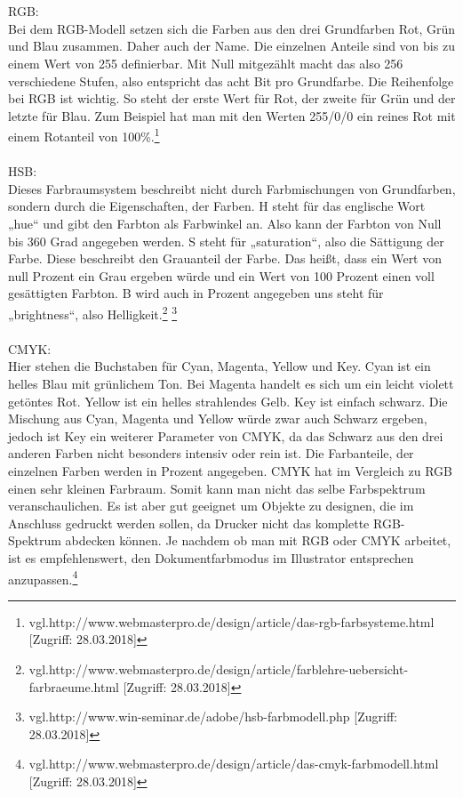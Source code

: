 \leavevmode \\
\leavevmode \\
RGB:
\leavevmode \\
Bei dem RGB-Modell setzen sich die Farben aus den drei Grundfarben Rot, Grün und Blau zusammen. Daher auch der Name. Die einzelnen Anteile sind von bis zu einem Wert von 255 definierbar. Mit Null mitgezählt macht das also 256 verschiedene Stufen, also entspricht das acht Bit pro Grundfarbe. Die Reihenfolge bei RGB ist wichtig. So steht der erste Wert für Rot, der zweite für Grün und der letzte für Blau. Zum Beispiel hat man mit den Werten 255/0/0 ein reines Rot mit einem Rotanteil von 100\%.\footnote{\label{} vgl.http://www.webmasterpro.de/design/article/das-rgb-farbsysteme.html [Zugriff: 28.03.2018]}
\leavevmode \\
\leavevmode \\
HSB:
\leavevmode \\
Dieses Farbraumsystem beschreibt nicht durch Farbmischungen von Grundfarben, sondern durch die Eigenschaften, der Farben. H steht für das englische Wort „hue“ und gibt den Farbton als Farbwinkel an. Also kann der Farbton von Null bis 360 Grad angegeben werden. S steht für „saturation“, also die Sättigung der Farbe. Diese beschreibt den Grauanteil der Farbe. Das heißt, dass ein Wert von null Prozent ein Grau ergeben würde und ein Wert von 100 Prozent einen voll gesättigten Farbton. B wird auch in Prozent angegeben uns steht für „brightness“, also Helligkeit.\footnote{\label{} vgl.http://www.webmasterpro.de/design/article/farblehre-uebersicht-farbraeume.html [Zugriff: 28.03.2018]}
\footnote{\label{} vgl.http://www.win-seminar.de/adobe/hsb-farbmodell.php [Zugriff: 28.03.2018]}
\leavevmode \\
\leavevmode \\
CMYK:
\leavevmode \\
Hier stehen die Buchstaben für Cyan, Magenta, Yellow und Key. Cyan ist ein helles Blau mit grünlichem Ton. Bei Magenta handelt es sich um ein leicht violett getöntes Rot. Yellow ist ein helles strahlendes Gelb. Key ist einfach schwarz. Die Mischung aus Cyan, Magenta und Yellow würde zwar auch Schwarz ergeben, jedoch ist Key ein weiterer Parameter von CMYK, da das Schwarz aus den drei anderen Farben nicht besonders intensiv oder rein ist. Die Farbanteile, der einzelnen Farben werden in Prozent angegeben. CMYK hat im Vergleich zu RGB einen sehr kleinen Farbraum. Somit kann man nicht das selbe Farbspektrum veranschaulichen. Es ist aber gut geeignet um Objekte zu designen, die im Anschluss gedruckt werden sollen, da Drucker nicht das komplette RGB-Spektrum abdecken können. Je nachdem ob man mit RGB oder CMYK arbeitet, ist es empfehlenswert, den Dokumentfarbmodus im Illustrator entsprechen anzupassen.\footnote{\label{} vgl.http://www.webmasterpro.de/design/article/das-cmyk-farbmodell.html [Zugriff: 28.03.2018]}
